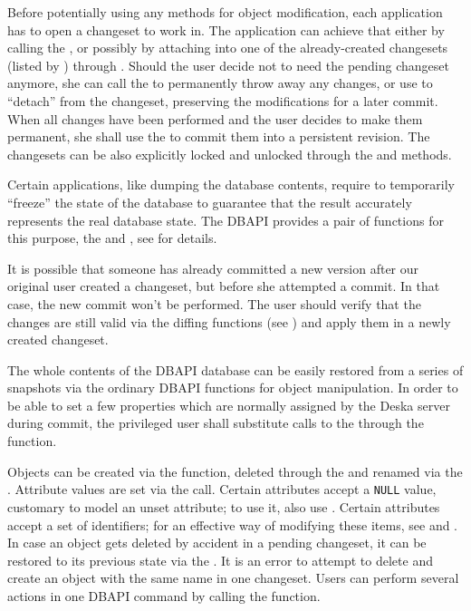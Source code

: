 \documentclass[deska]{subfiles}
\begin{document}
Before potentially using any methods for object modification, each application has to open a changeset to work in.  The
application can achieve that either by calling the , or possibly by attaching into one of
the already-created changesets (listed by ) through .
Should the user decide not to need the pending changeset anymore, she can call the 
to permanently throw away any changes, or use  to ``detach'' from the
changeset, preserving the modifications for a later commit.  When all changes have been performed and the user decides to
make them permanent, she shall use the  to commit them into a persistent revision.  The
changesets can be also explicitly locked and unlocked through the  and
 methods.

Certain applications, like dumping the database contents, require to temporarily ``freeze'' the state of the database to
guarantee that the result accurately represents the real database state.  The DBAPI provides a pair of functions for
this purpose, the  and , see  for
details.

It is possible that someone has already committed a new version after our original user created a changeset, but before
she attempted a commit.  In that case, the new commit won't be performed.  The user should verify that the changes are
still valid via the diffing functions (see ) and apply them in a newly created
changeset.

The whole contents of the DBAPI database can be easily restored from a series of snapshots via the ordinary DBAPI
functions for object manipulation.  In order to be able to set a few properties which are normally assigned by the Deska
server during commit, the privileged user shall substitute calls to the  through the
 function.

Objects can be created via the  function, deleted through the  and
renamed via the .  Attribute values are set via the  call.
Certain attributes accept a {\tt NULL} value, customary to model an unset attribute; to use it, also use
.  Certain attributes accept a set of identifiers; for an effective way of modifying these
items, see  and .
In case an object gets deleted by accident in a pending changeset, it can be restored to
its previous state via the .  It is an error to attempt to delete and create an
object with the same name in one changeset.  Users can perform several actions in one DBAPI command by calling the
 function.
\end{document}
